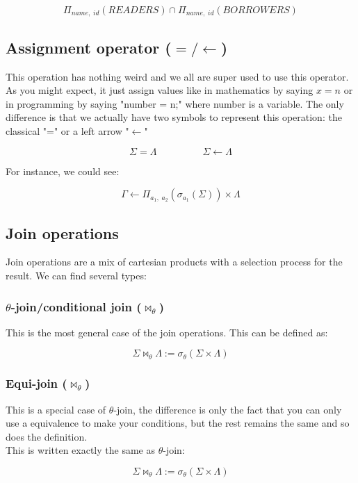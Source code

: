 \documentclass[12pt]{article}
\begin{document}
\[
    \Pi_{name,\;id}(READERS) \cap \Pi_{name,\;id}(BORROWERS)
\]

\subsection{Assignment operator (\( = / \leftarrow \))}

This operation has nothing weird and we all are super used to use this operator. As you might expect, it just assign values like in mathematics by saying \(x = n\) or in programming by saying "number = n;" where number is a variable.
The only difference is that we actually have two symbols to represent this operation: the classical "=" or a left arrow "\(\leftarrow  \)"

\[
    \Sigma = \Lambda \;\;\;\;\;\;\;\;\;\;\;\;\;\;\;\;\; \Sigma \leftarrow \Lambda
\]

For instance, we could see:

\[
    \Gamma \leftarrow \Pi_{a_1, \; a_2}(\sigma_{a_1}(\Sigma))\times\Lambda
\]

\subsection{Join operations}

Join operations are a mix of cartesian products with a selection process for the result. We can find several types:

\subsubsection{\(\theta\)-join/conditional join (\( \bowtie_\theta \))}

This is the most general case of the join operations.
This can be defined as:

\[
    \Sigma \bowtie_\theta \Lambda := \sigma_\theta(\Sigma\times\Lambda)
\]

\subsubsection{Equi-join (\( \bowtie_\theta \))}

This is a special case of \(\theta\)-join, the difference is only the fact that you can only use a equivalence to make your conditions, but the rest remains the same and so does the definition. \\
This is written exactly the same as \(\theta\)-join:

\[
    \Sigma \bowtie_\theta \Lambda := \sigma_\theta(\Sigma\times\Lambda)
\]
\end{document}
